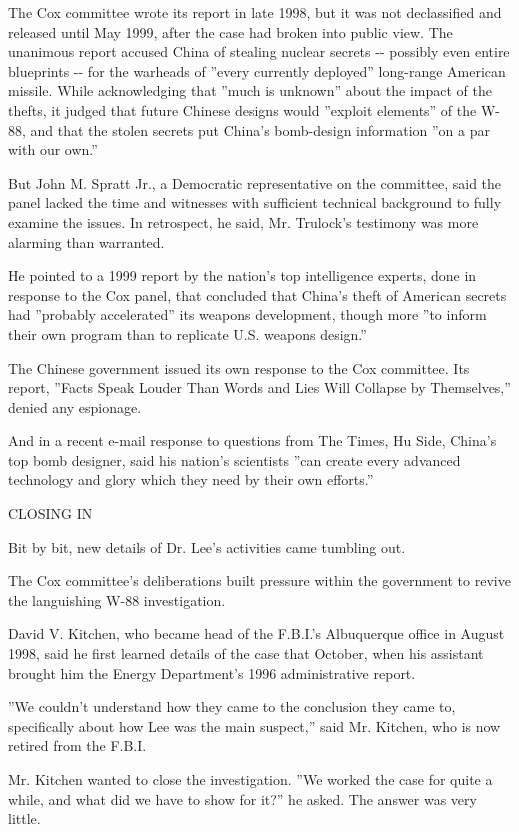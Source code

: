 The Cox committee wrote its report in late 1998, but it was not
declassified and released until May 1999, after the case had broken into
public view. The unanimous report accused China of stealing nuclear
secrets -\/- possibly even entire blueprints -\/- for the warheads of
''every currently deployed'' long-range American missile. While
acknowledging that ''much is unknown'' about the impact of the thefts,
it judged that future Chinese designs would ''exploit elements'' of the
W-88, and that the stolen secrets put China's bomb-design information
''on a par with our own.''

But John M. Spratt Jr., a Democratic representative on the committee,
said the panel lacked the time and witnesses with sufficient technical
background to fully examine the issues. In retrospect, he said, Mr.
Trulock's testimony was more alarming than warranted.

He pointed to a 1999 report by the nation's top intelligence experts,
done in response to the Cox panel, that concluded that China's theft of
American secrets had ''probably accelerated'' its weapons development,
though more ''to inform their own program than to replicate U.S. weapons
design.''

The Chinese government issued its own response to the Cox committee. Its
report, ''Facts Speak Louder Than Words and Lies Will Collapse by
Themselves,'' denied any espionage.

And in a recent e-mail response to questions from The Times, Hu Side,
China's top bomb designer, said his nation's scientists ''can create
every advanced technology and glory which they need by their own
efforts.''

CLOSING IN

Bit by bit, new details of Dr. Lee's activities came tumbling out.

The Cox committee's deliberations built pressure within the government
to revive the languishing W-88 investigation.

David V. Kitchen, who became head of the F.B.I.'s Albuquerque office in
August 1998, said he first learned details of the case that October,
when his assistant brought him the Energy Department's 1996
administrative report.

''We couldn't understand how they came to the conclusion they came to,
specifically about how Lee was the main suspect,'' said Mr. Kitchen, who
is now retired from the F.B.I.

Mr. Kitchen wanted to close the investigation. ''We worked the case for
quite a while, and what did we have to show for it?'' he asked. The
answer was very little.

